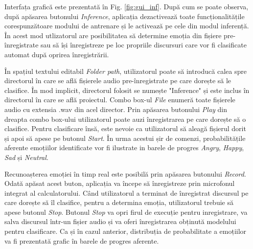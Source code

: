 \documentclass[a4paper,12pt]{book}
\begin{document}
		Interfața grafică este prezentată în Fig. \ref{fig:gui_inf}. După cum se poate observa, după apăsarea butonului \textit{Inference},	aplicația dezactivează toate funcționalitățile corespunzătoare modului de antrenare și le activează pe cele din modul inferență. În acest mod utlizatorul are posibilitatea să determine emoția din fișiere pre-înregistrate sau să își înregistreze pe loc propriile discursuri care vor fi clasificate automat după oprirea înregistrării. \par
		
		În spațiul textului editabil \textit{Folder path}, utilizatorul poate să introducă calea spre directorul în care se află fișierele audio pre-înregistrate pe care dorește să le clasifice. În mod implicit, directorul folosit se numește "Inference" și este inclus în directorul în care se află proiectul. Combo box-ul \textit{File} enumeră toate fișierele audio cu extensia .wav din acel director. Prin apăsarea butonului \textit{Play} din dreapta combo box-ului utilizatorul poate auzi înregistrarea pe care dorește să o clasifice. Pentru clasificare însă, este nevoie ca utilizatorul să aleagă fișierul dorit și apoi să apese pe butonul \textit{Start}. În urma acestui șir de comenzi, probabilitățile aferente emoțiilor identificate vor fi ilustrate in barele de progres \textit{Angry},  \textit{Happy}, \textit{Sad} și \textit{Neutral}. \par
		Recunoașterea emoției în timp real este posibilă prin apăsarea butonului \textit{Record}. Odată apăsat acest buton, aplicația va începe să înregistreze prin microfonul integrat al calculatorului. Când utilizatorul a terminat de înregistrat discursul pe care dorește să îl clasifice, pentru a determina emoția, utilizatorul trebuie să apese butonul \textit{Stop}. Butonul \textit{Stop} va opri firul de execuție pentru inregistrare, va salva discursul într-un fișier audio și va oferi înregistrarea obținută modelului pentru clasificare. Ca și în cazul anterior, distribuția de probabilitate a emoțiilor va fi prezentată grafic în barele de progres aferente. \par
\end{document}
